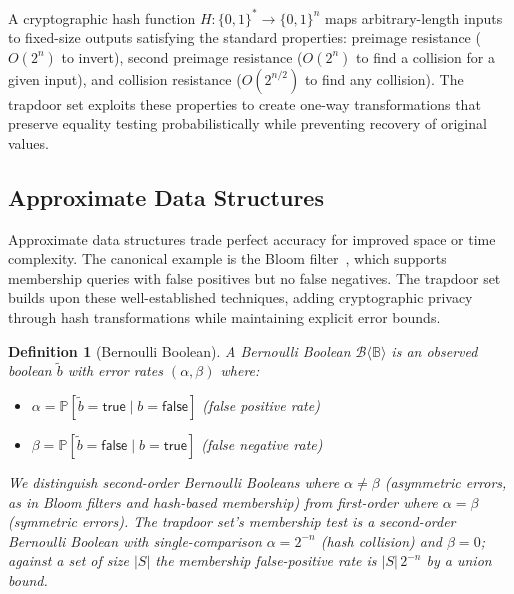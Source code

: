 \documentclass[10pt,conference]{IEEEtran}
\newtheorem{definition}[theorem]{Definition}
\newcommand{\fpr}{\alpha}                   %
\newcommand{\fnr}{\beta}                    %
\newcommand{\obs}[1]{\tilde{#1}}            %
\newcommand{\Bool}{\mathbb{B}}              %
\newcommand{\Bernoulli}[1]{\mathcal{B}\langle #1 \rangle}  %
\begin{document}
A cryptographic hash function $H: \{0,1\}^* \rightarrow \{0,1\}^n$ maps arbitrary-length inputs to fixed-size outputs satisfying the standard properties: preimage resistance ($O(2^n)$ to invert), second preimage resistance ($O(2^n)$ to find a collision for a given input), and collision resistance ($O(2^{n/2})$ to find any collision). The trapdoor set exploits these properties to create one-way transformations that preserve equality testing probabilistically while preventing recovery of original values.

\subsection{Approximate Data Structures}

Approximate data structures trade perfect accuracy for improved space or time complexity. The canonical example is the Bloom filter~\cite{bloom1970space}, which supports membership queries with false positives but no false negatives. The trapdoor set builds upon these well-established techniques, adding cryptographic privacy through hash transformations while maintaining explicit error bounds.

\begin{definition}[Bernoulli Boolean]
\label{def:bernoulli-boolean}
A \emph{Bernoulli Boolean} $\Bernoulli{\Bool}$ is an observed boolean $\obs{b}$ with error rates $(\fpr, \fnr)$ where:
\begin{itemize}
\item $\fpr = \mathbb{P}[\obs{b} = \mathsf{true} \mid b = \mathsf{false}]$ (false positive rate)
\item $\fnr = \mathbb{P}[\obs{b} = \mathsf{false} \mid b = \mathsf{true}]$ (false negative rate)
\end{itemize}
We distinguish \emph{second-order} Bernoulli Booleans where $\fpr \neq \fnr$ (asymmetric errors, as in Bloom filters and hash-based membership) from \emph{first-order} where $\fpr = \fnr$ (symmetric errors). The trapdoor set's membership test is a second-order Bernoulli Boolean with single-comparison $\fpr = 2^{-n}$ (hash collision) and $\fnr = 0$; against a set of size $|S|$ the membership false-positive rate is $|S|\,2^{-n}$ by a union bound.
\end{definition}
\end{document}
